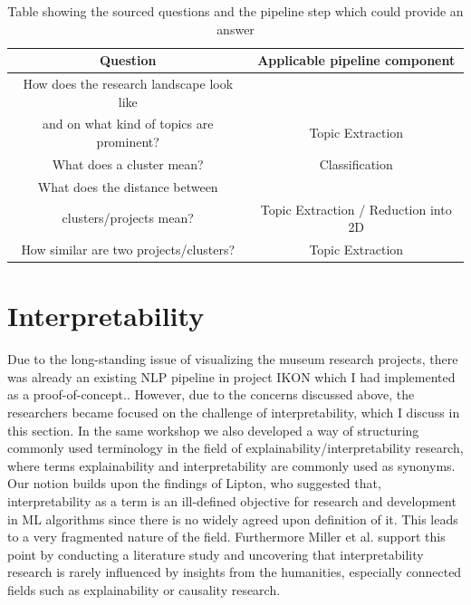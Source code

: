 \begin{table}
	\centering
	\begin{tabular}{ c | c }
		\hline 
		Question & Applicable pipeline component \\ \hline
		How does the research landscape look like \\ and on what kind of topics are prominent? & Topic Extraction \\ \hline
		What does a cluster mean? & Classification \\ \hline
		What does the distance between \\ clusters/projects mean? & Topic Extraction / Reduction into 2D \\ \hline
		How similar are two projects/clusters? & Topic Extraction \\
		\hline
	\end{tabular}
	\caption{\label{tab:overview_viz_questions} Table showing the sourced questions and the pipeline step which could provide an answer}
\end{table} 

\section{Interpretability}

Due to the long-standing issue of visualizing the museum research projects, there was already an existing NLP pipeline in project IKON which I had implemented as a proof-of-concept.. However, due to the concerns discussed above, the researchers became focused on the challenge of interpretability, which I discuss in this section. 
In the same workshop we also developed a way of structuring commonly used terminology in the field of explainability/interpretability research, where terms explainability and interpretability are commonly used as synonyms. Our notion builds upon the findings of Lipton, who suggested that, interpretability as a term is an ill-defined objective \cite{liptonMythosModelInterpretability2016a} for research and development in ML algorithms since there is no widely agreed upon definition of it. This leads to a very fragmented nature of the field. Furthermore Miller et al. \cite{millerExplainableAIBeware2017} support this point by conducting a literature study and uncovering that interpretability research is rarely influenced by insights from the humanities, especially connected fields such as explainability or causality research.

